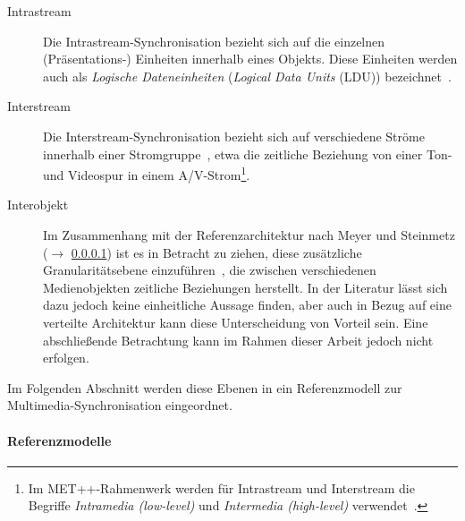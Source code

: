   \begin{description}
    \item[Intrastream] Die Intrastream-Synchronisation bezieht sich auf die einzelnen \mbox{(Präsentations-)} Einheiten innerhalb eines Objekts. Diese Einheiten werden auch als \emph{Logische Dateneinheiten} (\emph{Logical Data Units} (LDU)) bezeichnet~\citep{steinmetz1990spm}.
    \item[Interstream] Die Interstream-Synchronisation bezieht sich auf verschiedene Ströme innerhalb einer Stromgruppe~\citep{multimedia_technologie}, etwa die zeitliche Beziehung von einer Ton- und Videospur in einem A/V-Strom\footnote{Im MET++-Rahmenwerk werden für Intrastream und Interstream die Begriffe \emph{Intramedia (low-level)} und \emph{Intermedia (high-level)} verwendet~\citep[S. 73]{ackermann1996doo}.}.
    \item[Interobjekt] Im Zusammenhang mit der Referenzarchitektur nach Meyer und Steinmetz ($\to$ \ref{par:referenzmodelle}) ist es in Betracht zu ziehen, diese zusätzliche Granularitätsebene einzuführen~\citep[S. 264]{wu2001svo}, die zwischen verschiedenen Medienobjekten zeitliche Beziehungen herstellt. In der Literatur lässt sich dazu jedoch keine einheitliche Aussage finden, aber auch in Bezug auf eine verteilte Architektur kann diese Unterscheidung von Vorteil sein. Eine abschließende Betrachtung kann im Rahmen dieser Arbeit jedoch nicht erfolgen.
  \end{description}
  
  Im Folgenden Abschnitt werden diese Ebenen in ein Referenzmodell zur Multimedia-Synchronisation eingeordnet.


\paragraph{Referenzmodelle} %
\label{par:referenzmodelle}


